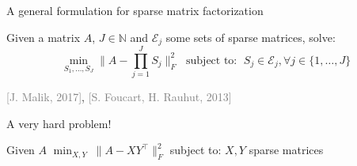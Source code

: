 \documentclass{beamer}
\newcommand{\mc}[1]{\mathcal{#1}}
\begin{document}
 





\begin{frame}{A general formulation for sparse matrix factorization}
	\begin{tcolorbox}[title = \textbf{Sparse Matrix Factorization Problem}]
		Given a matrix $A$, $J \in \mathbb{N}$ and $\mathcal{E}_j$ some sets of sparse matrices, solve:
		\setlength{\abovedisplayskip}{0pt}
		\begin{equation*}
				\underset{S_1, \ldots , S_J}{\min}  \|A - \prod_{j = 1}^J S_j\|_F^2   \;
				\text{ subject to: } \; S_j \in \mc{E}_j,   \forall j \in \{1, \ldots, J\} 
		\end{equation*}
	\end{tcolorbox}

			\begin{tiny}
	\textcolor{gray}{[J. Malik,   2017]}, 
	\textcolor{gray}{[S. Foucart, H. Rauhut,  
2013]}
\end{tiny}


A very hard problem! 


\begin{tcolorbox}[title=\textbf{Two} factors matrix factorization]

 
Given $A$
				$	\min_{X, Y} \; \|A - XY^\top\|_F^2$  subject to: $X, Y$ sparse matrices
	\end{tcolorbox}
		
	\end{frame}
\end{document}
